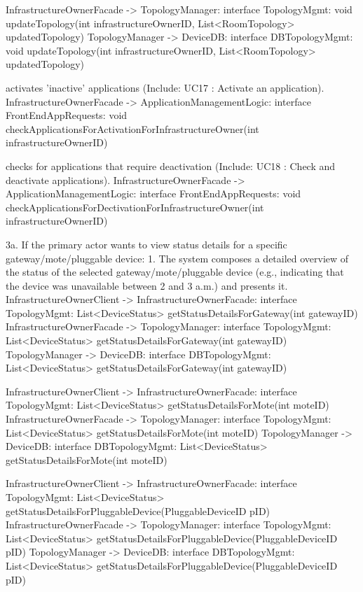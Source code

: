 {{{{{{{            InfrastructureOwnerFacade -> TopologyManager: interface TopologyMgmt: void updateTopology(int infrastructureOwnerID, List<RoomTopology> updatedTopology)
            TopologyManager -> DeviceDB: interface DBTopologyMgmt: void updateTopology(int infrastructureOwnerID, List<RoomTopology> updatedTopology)

           { activates 'inactive' applications (Include: UC17 : Activate an application).
            InfrastructureOwnerFacade -> ApplicationManagementLogic: interface FrontEndAppRequests: void checkApplicationsForActivationForInfrastructureOwner(int infrastructureOwnerID)

           { checks for applications that require deactivation (Include: UC18 : Check and deactivate applications).
            InfrastructureOwnerFacade -> ApplicationManagementLogic: interface FrontEndAppRequests: void checkApplicationsForDectivationForInfrastructureOwner(int infrastructureOwnerID)

        3a. If the primary actor wants to view status details for a specific gateway/mote/pluggable device:
            1. The system composes a detailed overview of the status of the selected gateway/mote/pluggable device (e.g., indicating that the device was unavailable between 2 and 3 a.m.) and presents it.
                InfrastructureOwnerClient -> InfrastructureOwnerFacade: interface TopologyMgmt: List<DeviceStatus> getStatusDetailsForGateway(int gatewayID)
                InfrastructureOwnerFacade -> TopologyManager: interface TopologyMgmt: List<DeviceStatus> getStatusDetailsForGateway(int gatewayID)
                TopologyManager -> DeviceDB: interface DBTopologyMgmt: List<DeviceStatus> getStatusDetailsForGateway(int gatewayID)

                InfrastructureOwnerClient -> InfrastructureOwnerFacade: interface TopologyMgmt: List<DeviceStatus> getStatusDetailsForMote(int moteID)
                InfrastructureOwnerFacade -> TopologyManager: interface TopologyMgmt: List<DeviceStatus> getStatusDetailsForMote(int moteID)
                TopologyManager -> DeviceDB: interface DBTopologyMgmt: List<DeviceStatus> getStatusDetailsForMote(int moteID)

                InfrastructureOwnerClient -> InfrastructureOwnerFacade: interface TopologyMgmt: List<DeviceStatus> getStatusDetailsForPluggableDevice(PluggableDeviceID pID)
                InfrastructureOwnerFacade -> TopologyManager: interface TopologyMgmt: List<DeviceStatus> getStatusDetailsForPluggableDevice(PluggableDeviceID pID)
                TopologyManager -> DeviceDB: interface DBTopologyMgmt: List<DeviceStatus> getStatusDetailsForPluggableDevice(PluggableDeviceID pID)


}}}}}}}}}
